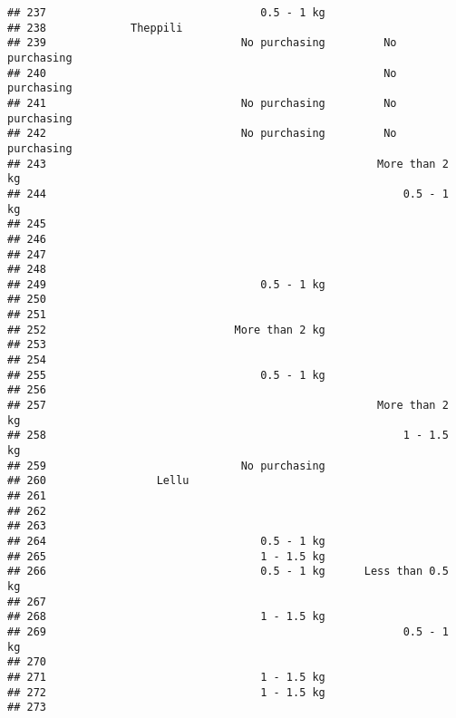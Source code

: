 \documentclass[
]{article}
\begin{document}
\begin{verbatim}
## 237                                 0.5 - 1 kg                      
## 238             Theppili                                            
## 239                              No purchasing         No purchasing
## 240                                                    No purchasing
## 241                              No purchasing         No purchasing
## 242                              No purchasing         No purchasing
## 243                                                   More than 2 kg
## 244                                                       0.5 - 1 kg
## 245                                                                 
## 246                                                                 
## 247                                                                 
## 248                                                                 
## 249                                 0.5 - 1 kg                      
## 250                                                                 
## 251                                                                 
## 252                             More than 2 kg                      
## 253                                                                 
## 254                                                                 
## 255                                 0.5 - 1 kg                      
## 256                                                                 
## 257                                                   More than 2 kg
## 258                                                       1 - 1.5 kg
## 259                              No purchasing                      
## 260                 Lellu                                           
## 261                                                                 
## 262                                                                 
## 263                                                                 
## 264                                 0.5 - 1 kg                      
## 265                                 1 - 1.5 kg                      
## 266                                 0.5 - 1 kg      Less than 0.5 kg
## 267                                                                 
## 268                                 1 - 1.5 kg                      
## 269                                                       0.5 - 1 kg
## 270                                                                 
## 271                                 1 - 1.5 kg                      
## 272                                 1 - 1.5 kg                      
## 273                                                                 

\end{verbatim}
\end{document}
